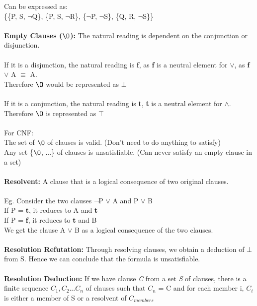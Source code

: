 \documentclass[a4paper,10pt]{article}
\begin{document}
\indent Can be expressed as: \\ 
\indent \{\{P, S, $\neg$Q\}, \{P, S, $\neg$R\}, \{$\neg$P, $\neg$S\}, \{Q, R, $\neg$S\}\} \\\\ 
\noindent \textcolor{RoyalPurple}{\textbf{Empty Clauses ($\O$):}} The natural reading is dependent on the conjunction or disjunction. \\ \\
\indent If it is a disjunction, the natural reading is \textbf{f}, as \textbf{f} is a neutral element for $\lor$, as \textbf{f} $\lor$ A $\equiv$ A. \\
\indent Therefore $\O$ would be represented as $\bot$\\ \\
\indent If it is a conjunction, the natural reading is \textbf{t}, \textbf{t} is a neutral element for $\land$. \\
\indent Therefore $\O$ is represented as $\top$\\ \\
\indent For CNF: \\
\indent The set of $\O$ of clauses is valid. (Don't need to do anything to satisfy)\\
\indent Any set \{$\O$, ...\} of clauses is unsatisfiable. (Can never satisfy an empty clause in a set)\\ \\
\noindent \textcolor{RoyalPurple}{\textbf{Resolvent:}} A clause that is a logical consequence of two original clauses. \\ \\
\indent Eg. Consider the two clauses $\neg$P $\lor$ A and P $\lor$ B \\ 
\indent If P = \textbf{t}, it reduces to A and \textbf{t} \\
\indent If P = \textbf{f}, it reduces to \textbf{t} and B \\
\indent We get the clause A $\lor$ B as a logical consequence of the two clauses. \\\\
\noindent \textcolor{RoyalPurple}{\textbf{Resolution Refutation:}} Through resolving clauses, we obtain a deduction of $\bot$ from S. Hence we can conclude that the formula is unsatisfiable. \\ \\
\noindent \textcolor{RoyalPurple}{\textbf{Resolution Deduction:}} If we have clause \emph{C} from a set \emph{S} of clauses, there is a finite sequence $C_{1}, C_{2} ... C_{n}$ of clauses such that $C_{n}$ = C and for each member i, $C_{i}$ is either a member of S or a resolvent of $C_{members}$\\ \\
\end{document}
